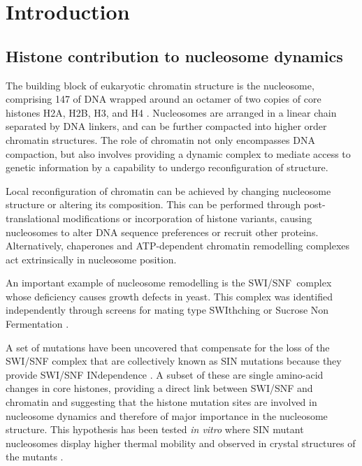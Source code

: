 \section{Introduction}

  \subsection{Histone contribution to nucleosome dynamics}

    The building block of eukaryotic chromatin structure is the nucleosome, comprising
    \SI{147}{\bp} of DNA wrapped around an octamer of two copies of core histones H2A,
    H2B, H3, and H4 \citep{luger1997crystal}.
    Nucleosomes are arranged in a linear chain separated by DNA linkers, and
    can be further compacted into higher order chromatin structures.
    The role of chromatin not only encompasses DNA compaction,
    but also involves providing a dynamic complex to mediate access to genetic
    information by a capability to undergo reconfiguration of structure. 

    Local reconfiguration of chromatin can be achieved
    by changing nucleosome structure or altering its composition.
    This can be performed through post-translational modifications
    or incorporation of histone variants,
    causing nucleosomes to alter DNA sequence preferences or recruit other proteins.
    Alternatively, chaperones and ATP-dependent chromatin remodelling complexes
    act extrinsically in nucleosome position.

    An important example of nucleosome remodelling is the SWI/SNF~complex
    whose deficiency causes growth defects in yeast.
    This complex was identified independently through screens for
    mating type SWIthching \citep{SWI-mutants}
    or Sucrose Non Fermentation \citep{SNF-mutants-original-discovery, SNF-mutants2}.

    A set of mutations have been uncovered that compensate
    for the loss of the SWI/SNF complex
    that are collectively known as SIN mutations because they
    provide SWI/SNF INdependence  .
    A subset of these are single amino-acid changes in core histones,
    providing a direct link between SWI/SNF and chromatin and suggesting
    that the histone mutation sites are involved in nucleosome dynamics and therefore
    of major importance in the nucleosome structure. This hypothesis has been tested \textit{in vitro}
    where SIN mutant nucleosomes display higher thermal mobility \citep{flaus2004sin}
    and observed in crystal structures of the mutants .

